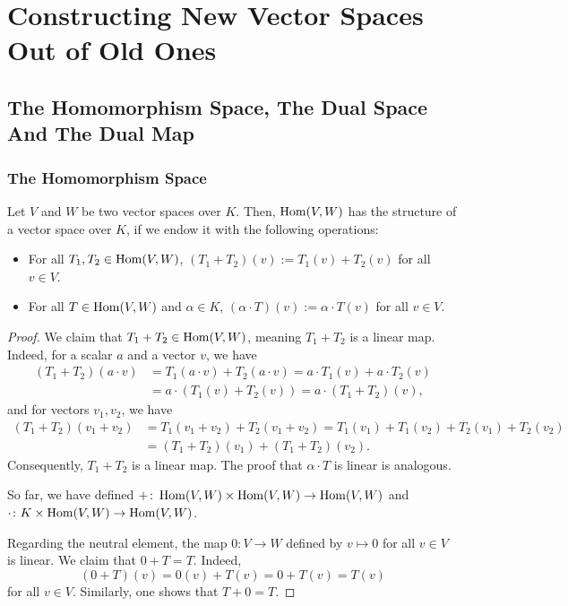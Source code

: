 \setcounter{chapter}{17} %
\chapter{Constructing New Vector Spaces Out of Old Ones}

\setcounter{section}{0}
\section{The Homomorphism Space, The Dual Space And The Dual Map}

\subsection{The Homomorphism Space}

\begin{proposition}
  Let $V$ and $W$ be two vector spaces over $K$. Then, $\operatorname{Hom}(V,W)$ has the structure of a vector space over $K$, if we endow it with the following operations:
  \begin{itemize}
    \item For all $T_1, T_2 \in \operatorname{Hom}(V,W)$, $(T_1 + T_2)(v) := T_1(v) + T_2(v)$ for all $v \in V$.
    \item For all $T \in \operatorname{Hom}(V,W)$ and $\alpha \in K$, $(\alpha \cdot T)(v) := \alpha \cdot T(v)$ for all $v \in V$.
  \end{itemize}
\end{proposition} 

\begin{proof}
  We claim that $T_1 + T_2 \in \operatorname{Hom}(V,W)$, meaning $T_1 + T_2$ is a linear map. Indeed, for a scalar $a$ and a vector $v$, we have
  \begin{align*}
    (T_1 + T_2)(a \cdot v) &= T_1(a \cdot v) + T_2(a \cdot v) = a \cdot T_1(v) + a \cdot T_2(v) \\
    &= a \cdot (T_1(v) + T_2(v)) = a \cdot (T_1 + T_2)(v),
  \end{align*}
  and for vectors $v_1, v_2$, we have
  \begin{align*}
    (T_1 + T_2)(v_1 + v_2) &= T_1(v_1 + v_2) + T_2(v_1 + v_2) = T_1(v_1) + T_1(v_2) + T_2(v_1) + T_2(v_2) \\
    &= (T_1 + T_2)(v_1) + (T_1 + T_2)(v_2).
  \end{align*}
  Consequently, $T_1 + T_2$ is a linear map. The proof that $\alpha \cdot T$ is linear is analogous.

  So far, we have defined $+ \colon \operatorname{Hom}(V,W) \times \operatorname{Hom}(V,W) \to \operatorname{Hom}(V,W)$ and $\cdot \colon K \times \operatorname{Hom}(V,W) \to \operatorname{Hom}(V,W)$.

  Regarding the neutral element, the map $0 \colon V \to W$ defined by $v \mapsto 0$ for all $v \in V$ is linear. We claim that $0 + T = T$. Indeed,
  \[ (0 + T)(v) = 0(v) + T(v) = 0 + T(v) = T(v) \]
  for all $v \in V$. Similarly, one shows that $T + 0 = T$.
\end{proof}

